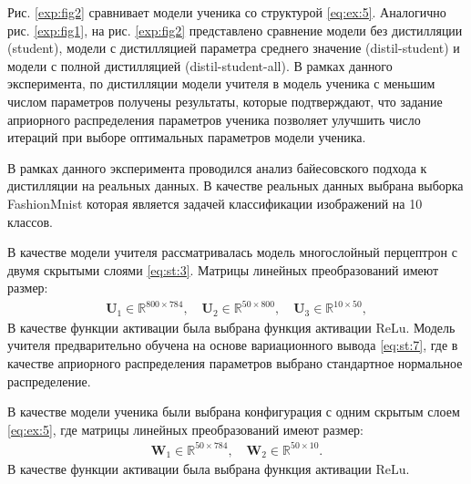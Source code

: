 Рис. \ref{exp:fig2} сравнивает модели ученика со структурой \eqref{eq:ex:5}. Аналогично рис. \ref{exp:fig1}, на рис. \ref{exp:fig2} представлено сравнение модели без дистилляции (student), модели с дистилляцией параметра среднего значение (distil-student) и модели с полной дистилляцией (distil-student-all). В рамках данного эксперимента, по дистилляции модели учителя в модель ученика с меньшим числом параметров получены результаты, которые подтверждают, что задание априорного распределения параметров ученика позволяет улучшить число итераций при выборе оптимальных параметров модели ученика.

В рамках данного эксперимента проводился анализ байесовского подхода к дистилляции на реальных данных.  В качестве реальных данных выбрана выборка FashionMnist \cite{fashionmnist} которая является задачей классификации изображений на 10 классов.

В качестве модели учителя рассматривалась модель многослойный перцептрон с двумя скрытыми слоями \eqref{eq:st:3}. Матрицы линейных преобразований имеют размер:
\[
\label{eq:ex:7}
\begin{aligned}
\mathbf{U}_{1} \in \mathbb{R}^{800 \times 784}, \quad \mathbf{U}_{2} \in \mathbb{R}^{50 \times 800}, \quad \mathbf{U}_{3} \in \mathbb{R}^{10 \times 50},
\end{aligned}
\]
В качестве функции активации была выбрана функция активации $\text{ReLu}$.
Модель учителя предварительно обучена на основе вариационного вывода \eqref{eq:st:7}, где в качестве априорного распределения параметров выбрано стандартное нормальное распределение.

В качестве модели ученика были выбрана конфигурация с одним скрытым слоем \eqref{eq:ex:5}, где матрицы линейных преобразований имеют размер:
\[
\label{eq:ex:7}
\begin{aligned}
\mathbf{W}_{1} \in \mathbb{R}^{50 \times 784}, \quad \mathbf{W}_{2} \in \mathbb{R}^{50 \times 10}.
\end{aligned}
\]
В качестве функции активации была выбрана функция активации $\text{ReLu}$.

